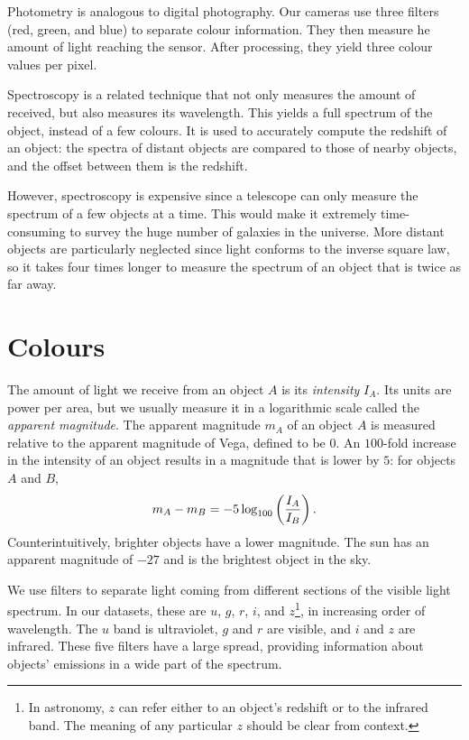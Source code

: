 \documentclass[11pt,twoside,openright]{report}
\begin{document}
  Photometry is analogous to digital photography. Our cameras use three filters (red, green, and blue) to separate colour information. They then measure he amount of light reaching the sensor. After processing, they yield three colour values per pixel.

  Spectroscopy is a related technique that not only measures the amount of received, but also measures its wavelength. This yields a full spectrum of the object, instead of a few colours. It is used to accurately compute the redshift of an object: the spectra of distant objects are compared to those of nearby objects, and the offset between them is the redshift.

  However, spectroscopy is expensive since a telescope can only measure the spectrum of a few objects at a time. This would make it extremely time-consuming to survey the huge number of galaxies in the universe. More distant objects are particularly neglected since light conforms to the inverse square law, so it takes four times longer to measure the spectrum of an object that is twice as far away.

  \section{Colours}

  The amount of light we receive from an object $A$ is its \emph{intensity} $I_A$. Its units are power per area, but we usually measure it in a logarithmic scale called the \emph{apparent magnitude}. The apparent magnitude $m_A$ of an object $A$ is measured relative to the apparent magnitude of Vega, defined to be $0$. An $100$-fold increase in the intensity of an object results in a magnitude that is lower by $5$: for objects $A$ and $B$,\[
    m_A - m_B = -5 \log_{100} \left( \frac{I_A}{I_B} \right) \text.
  \] Counterintuitively, brighter objects have a lower magnitude. The sun has an apparent magnitude of $-27$ and is the brightest object in the sky.

  We use filters to separate light coming from different sections of the visible light spectrum. In our datasets, these are $u$, $g$, $r$, $i$, and $z$\footnote{In astronomy, $z$ can refer either to an object's redshift or to the infrared band. The meaning of any particular $z$ should be clear from context.}, in increasing order of wavelength. The $u$ band is ultraviolet, $g$ and $r$ are visible, and $i$ and $z$ are infrared. These five filters have a large spread, providing information about objects' emissions in a wide part of the spectrum.
\end{document}
